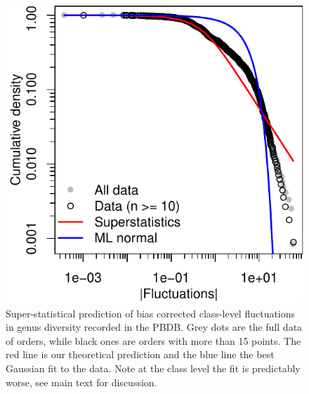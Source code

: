 \documentclass[12pt]{article}
\begin{document}
\begin{figure}[!hp]
  \centering
  \includegraphics[scale=0.7]{figs/figSupp_Px_cls.pdf}
  \caption[Super-statistical prediction of bias corrected class-level
  data]{Super-statistical prediction of bias corrected class-level
    fluctuations in genus diversity recorded in the PBDB. Grey dots
    are the full data of orders, while black ones are orders with more
    than 15 points. The red line is our theoretical prediction and the
    blue line the best Gaussian fit to the data. Note at the class
    level the fit is predictably worse, see main text for discussion.}
  \label{fig:supp_PBDB_Px_cls}
\end{figure}
\end{document}
